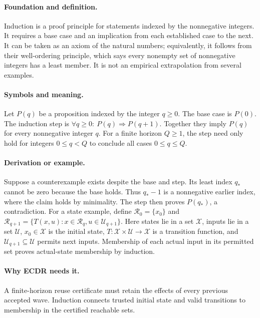 
\paragraph{Foundation and definition.}
Induction is a proof principle for statements indexed by the
nonnegative integers. It requires a base case and an implication from
each established case to the next. It can be taken as an axiom of the
natural numbers; equivalently, it follows from their well-ordering
principle, which says every nonempty set of nonnegative integers has a
least member. It is not an empirical extrapolation from several examples.
\paragraph{Symbols and meaning.}
Let $P(q)$ be a proposition indexed by the integer $q\ge0$. The base
case is $P(0)$. The induction step is
$\forall q\ge0:\ P(q)\Rightarrow P(q+1)$. Together they imply
$P(q)$ for every nonnegative integer $q$. For a finite horizon
$Q\ge1$, the step need only hold for integers $0\le q<Q$ to conclude
all cases $0\le q\le Q$.
\paragraph{Derivation or example.}
Suppose a counterexample exists despite the base and step. Its least
index $q_*$ cannot be zero because the base holds. Thus $q_*-1$ is a
nonnegative earlier index, where the claim holds by minimality. The step
then proves $P(q_*)$, a contradiction. For a state example, define
$\mathcal R_0=\{x_0\}$ and
$\mathcal R_{q+1}=\{T(x,u):x\in\mathcal R_q,u\in\mathcal U_{q+1}\}$.
Here states lie in a set $\mathcal X$, inputs lie in a set
$\mathcal U$, $x_0\in\mathcal X$ is the initial state,
$T:\mathcal X\times\mathcal U\to\mathcal X$ is a transition function,
and $\mathcal U_{q+1}\subseteq\mathcal U$ permits next inputs. Membership of each
actual input in its permitted set proves actual-state membership by
induction.
\paragraph{Why ECDR needs it.}
A finite-horizon reuse certificate must retain the effects of every
previous accepted wave. Induction connects trusted initial state and
valid transitions to membership in the certified reachable sets.
